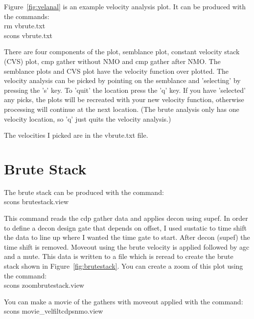 Figure~\ref{fig:velanal} is an example velocity analysis plot.  It can 
be produced with the commands: \\
rm vbrute.txt \\
scons vbrute.txt

There are four components of the plot, semblance plot, constant velocity 
stack (CVS) plot, cmp gather without NMO and cmp gather after NMO.  The 
semblance plots and CVS plot have the velocity function over plotted.  
The velocity analysis can be picked by pointing on the semblance and 
'selecting' by pressing the 's' key.  To 'quit' the location press the 
'q' key.  If you have 'selected' any picks, the plots will be recreated 
with your new velocity function, otherwise processing will continue at 
the next location.  (The brute analysis only has one velocity location, 
so 'q' just quits the velocity analysis.)

The velocities I picked are in the vbrute.txt file.


\section{Brute Stack}
The brute stack can be produced with the command: \\
scons brutestack.view

This command reads the cdp gather data and applies decon using supef.  In 
order to define a decon design gate that depends on offset, I used sustatic 
to time shift the data to line up where I wanted the time gate to start.  
After decon (supef) the time shift is removed.  Moveout using the brute 
velocity is applied followed by agc and a mute.  This data is written to a 
file which is reread to create the brute stack shown in 
Figure~\ref{fig:brutestack}.  You can create a zoom of this plot using the 
command:\\
scons zoombrutestack.view

You can make a movie of the gathers with moveout applied with the command: \\
scons movie\_velfiltcdpsnmo.view


